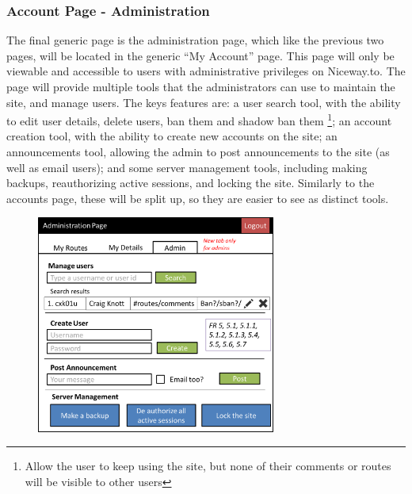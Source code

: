 \documentclass[a4paper,twoside,notitlepage,11pt]{article}
\begin{document}
\subsubsection{Account Page - Administration}
The final generic page is the administration page, which like the previous two pages, will be located in the generic ``My Account'' page. This page will only be viewable and accessible to users with administrative privileges on Niceway.to. The page will provide multiple tools that the administrators can use to maintain the site, and manage users. The keys features are: a user search tool, with the ability to edit user details, delete users, ban them and shadow ban them \footnote{Allow the user to keep using the site, but none of their comments or routes will be visible to other users}; an account creation tool, with the ability to create new accounts on the site; an announcements tool, allowing the admin to post announcements to the site (as well as email users); and some server management tools, including making backups, reauthorizing active sessions, and locking the site. Similarly to the accounts page, these will be split up, so they are easier to see as distinct tools. 
\begin{figure}[!ht]
	\begin{center}
		\includegraphics[width=0.7\textwidth]{images/ui-admin.png}
	\end{center}
	\vspace{-6mm}
\end{figure}

 
\end{document}
